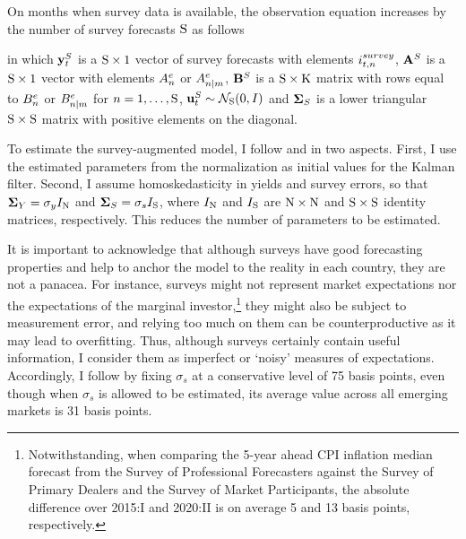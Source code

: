 {On months when survey data is available, the observation equation increases by the number of survey forecasts \(\mathrm{S}\) as follows
	
\noindent in which \(\mathbf{y}_{t}^{S}\) is a \(\mathrm{S} \times 1\) vector of survey forecasts with elements \(i_{t,n}^{survey}\), \(\mathbf{A}^{S}\) is a \(\mathrm{S} \times 1\) vector with elements \(A_{n}^{e}\) or \(A_{n | m}^{e}\), \(\mathbf{B}^{S}\) is a \(\mathrm{S} \times \mathrm{K}\) matrix with rows equal to \(B_{n}^{e}\) or \(B_{n | m}^{e}\) for \(n = 1, \ldots, \mathrm{S}\), \(\mathbf{u}_{t}^{S} \sim \mathcal{N}_{\mathrm{S}} (0,I) \) and \(\mathbf{\mathbf{\Sigma}}_{S}\) is a lower triangular \(\mathrm{S} \times \mathrm{S}\) matrix with positive elements on the diagonal.

To estimate the survey-augmented model, I follow \cite{Guimaraes:2014} and \cite{Lloyd:2020} in two aspects. First, I use the estimated parameters from the \cite{JSZ:2011} normalization as initial values for the Kalman filter.
Second, I assume homoskedasticity in yields and survey errors, so that \(\mathbf{\mathbf{\Sigma}}_{Y} = \sigma_y I_{\mathrm{N}}\) and \(\mathbf{\mathbf{\Sigma}}_{S} = \sigma_s I_{\mathrm{S}}\), where \(I_{\mathrm{N}}\) and \(I_{\mathrm{S}}\) are \(\mathrm{N} \times \mathrm{N}\) and \(\mathrm{S} \times \mathrm{S}\) identity matrices, respectively.
This reduces the number of parameters to be estimated.

It is important to acknowledge that although surveys have good forecasting properties and help to anchor the model to the reality in each country, they are not a panacea. 
For instance, surveys might not represent market expectations nor the expectations of the marginal investor,\footnote{ Notwithstanding, when comparing the 5-year ahead CPI inflation median forecast from the Survey of Professional Forecasters against the Survey of Primary Dealers and the Survey of Market Participants, the absolute difference over 2015:I and 2020:II is on average 5 and 13 basis points, respectively.} they might also be subject to measurement error, %
and relying too much on them can be counterproductive as it may lead to overfitting.
Thus, although surveys certainly contain useful information, I consider them as imperfect or `noisy' measures of expectations. 
Accordingly, I follow \cite{KimOrphanides:2012} by
fixing \(\sigma_s\) at a conservative level of 75 basis points, even though when \(\sigma_s\) is allowed to be estimated, its average value across all emerging markets is 31 basis points.

}
